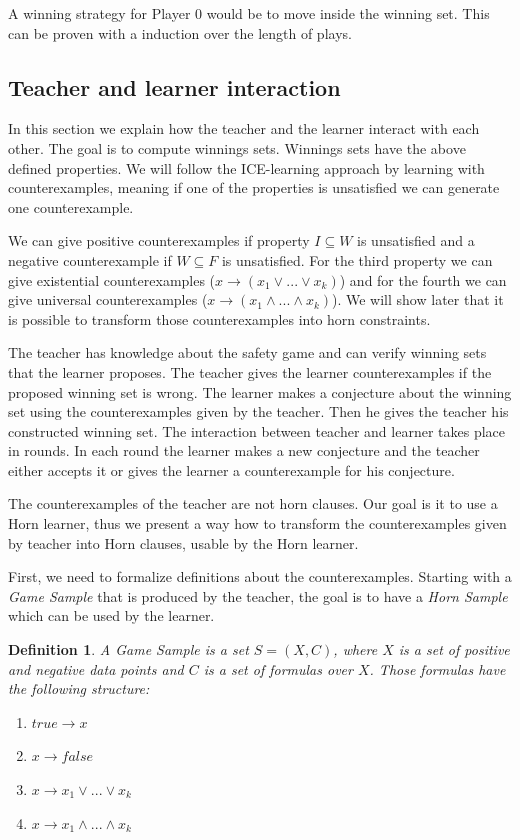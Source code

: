 \documentclass[10pt,a4paper]{article}
\theoremstyle{plain}
\newtheorem{mydef}[thm]{Definition}
\theoremstyle{definition}
\begin{document}
A winning strategy for Player 0 would be to move inside the winning set. This can be proven with a induction over the length of plays.

\subsection{Teacher and learner interaction}

In this section we explain how the teacher and the learner interact with each other.
The goal is to compute winnings sets. Winnings sets have the above defined properties. We will follow the ICE-learning approach by learning with counterexamples, meaning if one of the properties is unsatisfied we can generate one counterexample. 

We can give positive counterexamples if property $I \subseteq W$ is unsatisfied and a negative counterexample if $W \subseteq F$ is unsatisfied.
For the third property we can give existential counterexamples ($ x \to (x_1 \vee  ... \vee x_k)$) and for the fourth we can give universal counterexamples ($ x\to (x_1 \wedge ... \wedge x_k)$). We will show later that it is possible to transform those counterexamples into horn constraints.

The teacher has knowledge about the safety game and can verify winning sets that the learner proposes. The teacher gives the learner counterexamples if the proposed winning set is wrong. 
The learner makes a conjecture about the winning set using the counterexamples given by the teacher. Then he gives the teacher his constructed winning set.
The interaction between teacher and learner takes place in rounds. In each round the learner makes a new conjecture and the teacher either accepts it or gives the learner a counterexample for his conjecture.

The counterexamples of the teacher are not horn clauses. Our goal is it to use a Horn learner, thus we present a way how to transform the counterexamples given by teacher into Horn clauses, usable by the Horn learner. 

First, we need to formalize definitions about the counterexamples. Starting with a \emph{Game Sample} that is produced by the teacher, the goal is to have a \emph{Horn Sample} which can be used by the learner. 


\begin{mydef}
A \emph{Game Sample} is a set $S = (X,C)$, where $X$ is a set of positive and negative data points and $C$ is a set of formulas over $X$. Those formulas have the following structure:
\begin{enumerate}
\item $true \to x$
\item $x \to false$
\item $x \to x_1 \vee  ... \vee x_k$
\item $x \to x_1 \wedge ... \wedge x_k$ 
\end{enumerate}
\end{mydef}
\end{document}
